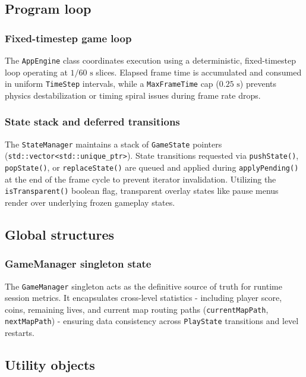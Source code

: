 \documentclass[12pt, a4paper]{article}
\begin{document}
\subsection{Program loop}

\subsubsection{Fixed-timestep game loop}
The \texttt{AppEngine} class coordinates execution using a deterministic, fixed-timestep loop operating at $1/60\text{ s}$ slices. Elapsed frame time is accumulated and consumed in uniform \texttt{TimeStep} intervals, while a \texttt{MaxFrameTime} cap ($0.25\text{ s}$) prevents physics destabilization or timing spiral issues during frame rate drops.

\subsubsection{State stack and deferred transitions}
The \texttt{StateManager} maintains a stack of \texttt{GameState} pointers (\texttt{std::vector<std::unique\_ptr>}). State transitions requested via \texttt{pushState()}, \texttt{popState()}, or \texttt{replaceState()} are queued and applied during \texttt{applyPending()} at the end of the frame cycle to prevent iterator invalidation. Utilizing the \texttt{isTransparent()} boolean flag, transparent overlay states like pause menus render over underlying frozen gameplay states.

\subsection{Global structures}

\subsubsection{GameManager singleton state}
The \texttt{GameManager} singleton acts as the definitive source of truth for runtime session metrics. It encapsulates cross-level statistics - including player score, coins, remaining lives, and current map routing paths (\texttt{currentMapPath}, \texttt{nextMapPath}) - ensuring data consistency across \texttt{PlayState} transitions and level restarts.

\subsection{Utility objects}
\end{document}
